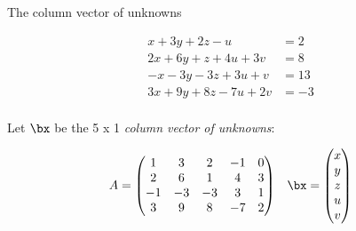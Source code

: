 \documentclass{beamer}
\begin{document}

\begin{frame}{The column vector of unknowns}

\begin{align*}
 x + 3y + 2z - u  \qquad &= 2 \\
2x + 6y + z + 4u + 3v  &= 8 \\
-x -3y  -3z + 3u + v  &= 13 \\
3x + 9y + 8z  -7u + 2v  &= -3 \\
\end{align*}

Let $\bx$ be the 5 x 1  \emph{column vector of unknowns}:

$$
\begin{matrix}
A =
\begin{pmatrix}
1 & 3 & 2 & -1 & 0 \\
2 & 6 & 1 & 4 & 3\\
-1 & -3 & -3 & 3 & 1 \\
3 & 9 & 8 & -7 & 2
\end{pmatrix}
&
\bx =
\begin{pmatrix}
x \\ y \\ z \\ u \\ v
\end{pmatrix}
\end{matrix}
$$

\end{frame}

\end{document}
